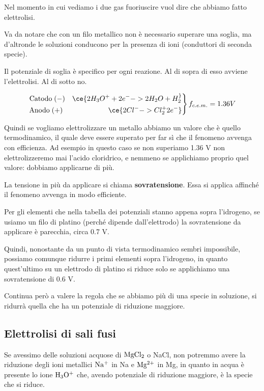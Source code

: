 Nel momento in cui vediamo i due gas fuoriuscire vuol dire che abbiamo fatto elettrolisi.

Va da notare che con un filo metallico non è necessario superare una soglia, ma d'altronde le soluzioni conducono per la presenza di ioni (conduttori di seconda specie).

Il potenziale di soglia è specifico per ogni reazione. Al di sopra di esso avviene l'elettrolisi. Al di sotto no.

\begin{equation*}
    \left.\begin{aligned}
    \text{Catodo} \; (-) \quad \ce{2H_3O^+ + 2e^- -> 2H_2O + H_2 ^}\\
    \text{Anodo} \; (+) \hspace{1.9cm} \quad \ce{2Cl^- -> Cl_2 ^ + 2 e^-}
  \end{aligned}\right\} f_{c.e.m.}=1.36 V
\end{equation*}

Quindi se vogliamo elettrolizzare un metallo abbiamo un valore che è quello termodinamico, il quale deve essere superato per far sì che il fenomeno avvenga con efficienza. Ad esempio in questo caso se non superiamo 1.36 V non elettrolizzeremo mai l'acido cloridrico, e nemmeno se applichiamo proprio quel valore: dobbiamo applicarne di più. 

La tensione in più da applicare si chiama \textbf{sovratensione}. Essa si applica affinché il fenomeno avvenga in modo efficiente.

Per gli elementi che nella tabella dei potenziali stanno appena sopra l'idrogeno, se usiamo un filo di platino (perché dipende dall'elettrodo) la sovratensione da applicare è parecchia, circa 0.7 V.

Quindi, nonostante da un punto di vista termodinamico sembri impossibile, possiamo comunque ridurre i primi elementi sopra l'idrogeno, in quanto quest'ultimo su un elettrodo di platino si riduce solo se applichiamo una sovratensione di 0.6 V.

Continua però a valere la regola che se abbiamo più di una specie in soluzione, si ridurrà quella che ha un potenziale di riduzione maggiore.

\subsection{Elettrolisi di sali fusi}

Se avessimo delle soluzioni acquose di $\rm MgCl_2$ o NaCl, non potremmo avere la riduzione degli ioni metallici $\rm Na^+$ in Na e $\rm Mg^{2+}$ in Mg, in quanto in acqua è presente lo ione $\rm H_3O^+$ che, avendo potenziale di riduzione maggiore, è la specie che si riduce.

